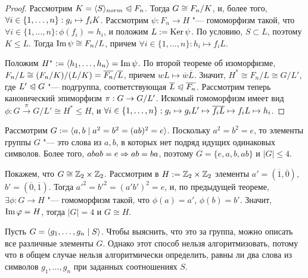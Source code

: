 \begin{proof}
	Рассмотрим $K = \langle S\rangle_{norm} \trianglelefteqslant F_n$. Тогда $G \hm\cong F_n/K$, и, более того, $\forall i \hm\in \{1, \dotsc, n\}: g_i \mapsto f_iK$. Рассмотрим $\psi: F_n \to H$ "--- гомоморфизм такой, что $\forall i \in \{1, \dotsc, n\}: \phi(f_i) = h_i$, и положим $L := \operatorname{Ker}\psi$. По условию, $S \subset L$, поэтому $K \le L$. Тогда $\operatorname{Im}\psi \cong F_n / L$, причем $\forall i \in \{1, \dotsc, n\}: h_i \mapsto f_iL$.
	
	Положим $H^* := \langle h_1, \dotsc, h_n\rangle = \operatorname{Im}\psi$. По второй теореме об изоморфизме, $F_n / L \hm\cong (F_n / K) / (L / K) = \overline{F_n} / \overline{L}$, причем $wL \mapsto \overline{w}\overline{L}$. Значит, $H^*  \cong F_n / L \cong G / L'$, где $L' \trianglelefteqslant G$ "--- подгруппа, соответствующая $\overline{L} \trianglelefteqslant \overline{F_n}$. Рассмотрим теперь канонический эпиморфизм $\pi: G \hm\to G / L'$. Искомый гомоморфизм имеет вид $\phi: G \xrightarrow{\pi} G / L' \cong H^* \le H$, и $\forall i \in \{1, \dotsc, n\}: g_i \mapsto g_iL' \mapsto \overline{f_i}\overline{L} \hm\mapsto f_iL \mapsto h_i$.
\end{proof}

\begin{example}
	Рассмотрим $G := \langle a, b\mid a^2=b^2=(ab)^2 = e\rangle$. Поскольку $a^2 = b^2 = e$, то элементы группы $G$ "--- это слова из $a, b$, в которых нет подряд идущих одинаковых символов. Более того, $abab = e \ra ab \hm= ba$, поэтому $G = \{e, a, b, ab\}$ и $|G| \le 4$.
	
	Покажем, что $G \cong \mathbb{Z}_2\times\mathbb{Z}_2$. Рассмотрим в $H := \mathbb{Z}_2\times\mathbb{Z}_2$ элементы $a' = (\overline{1}, \overline{0})$, $b' = (\overline{0}, \overline{1})$. Тогда $a'^2 = b'^2 = (a'b')^2 = e$, и, по предыдущей теореме, $\exists \phi: G \to H$ "--- гомоморфизм такой, что $\phi(a) = a'$, $\phi(b) = b'$. Значит, $\operatorname{Im}\varphi = H$, тогда $|G| = 4$ и $G \cong H$.
\end{example}

\begin{note}
	Пусть $G = \langle g_1, \dotsc, g_n\mid S\rangle$. Чтобы выяснить, что это за группа, можно описать все различные элементы $G$. Однако этот способ нельзя алгоритмизовать, потому что в общем случае нельзя алгоритмически определить, равны ли два слова из символов $g_1, \dotsc, g_n$ при заданных соотношениях $S$.
\end{note}